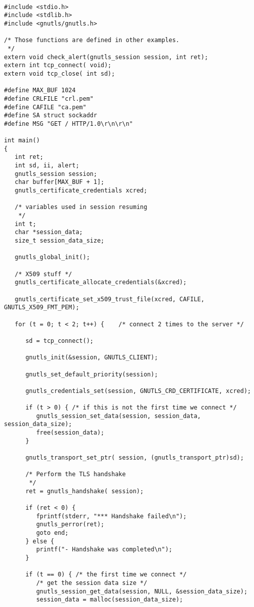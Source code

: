 \begin{verbatim}

#include <stdio.h>
#include <stdlib.h>
#include <gnutls/gnutls.h>

/* Those functions are defined in other examples.
 */
extern void check_alert(gnutls_session session, int ret);
extern int tcp_connect( void);
extern void tcp_close( int sd);

#define MAX_BUF 1024
#define CRLFILE "crl.pem"
#define CAFILE "ca.pem"
#define SA struct sockaddr
#define MSG "GET / HTTP/1.0\r\n\r\n"

int main()
{
   int ret;
   int sd, ii, alert;
   gnutls_session session;
   char buffer[MAX_BUF + 1];
   gnutls_certificate_credentials xcred;

   /* variables used in session resuming 
    */
   int t;
   char *session_data;
   size_t session_data_size;

   gnutls_global_init();

   /* X509 stuff */
   gnutls_certificate_allocate_credentials(&xcred);

   gnutls_certificate_set_x509_trust_file(xcred, CAFILE, GNUTLS_X509_FMT_PEM);

   for (t = 0; t < 2; t++) {    /* connect 2 times to the server */

      sd = tcp_connect();

      gnutls_init(&session, GNUTLS_CLIENT);

      gnutls_set_default_priority(session);

      gnutls_credentials_set(session, GNUTLS_CRD_CERTIFICATE, xcred);

      if (t > 0) { /* if this is not the first time we connect */
         gnutls_session_set_data(session, session_data, session_data_size);
         free(session_data);
      }
      
      gnutls_transport_set_ptr( session, (gnutls_transport_ptr)sd);

      /* Perform the TLS handshake
       */
      ret = gnutls_handshake( session);

      if (ret < 0) {
         fprintf(stderr, "*** Handshake failed\n");
         gnutls_perror(ret);
         goto end;
      } else {
         printf("- Handshake was completed\n");
      }

      if (t == 0) { /* the first time we connect */
         /* get the session data size */
         gnutls_session_get_data(session, NULL, &session_data_size);
         session_data = malloc(session_data_size);


\end{verbatim}
